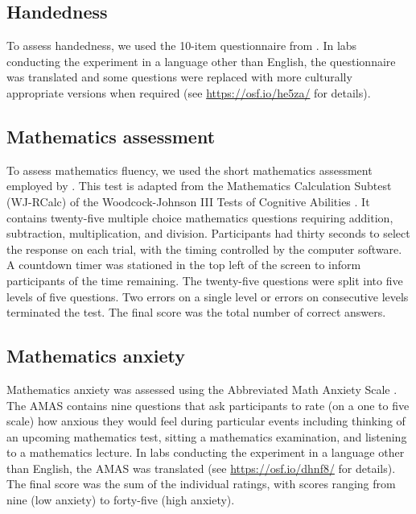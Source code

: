 \documentclass[A4paper,man,floatsintext]{apa6}
\theoremstyle{definition}
\theoremstyle{definition}
\theoremstyle{definition}
\theoremstyle{remark}
\begin{document}
\subsection{Handedness}\label{handedness}

To assess handedness, we used the 10-item questionnaire from
\textcite{Nicholls:2013ha}. In labs conducting the experiment in a
language other than English, the questionnaire was translated and some
questions were replaced with more culturally appropriate versions when
required (see \url{https://osf.io/he5za/} for details).

\subsection{Mathematics assessment}\label{mathematics-assessment}

To assess mathematics fluency, we used the short mathematics assessment
employed by \textcite{Tibber:2013ho}. This test is adapted from the
Mathematics Calculation Subtest (WJ-RCalc) of the Woodcock-Johnson III
Tests of Cognitive Abilities \autocite{Woodcock:1989ww}. It contains
twenty-five multiple choice mathematics questions requiring addition,
subtraction, multiplication, and division. Participants had thirty
seconds to select the response on each trial, with the timing controlled
by the computer software. A countdown timer was stationed in the top
left of the screen to inform participants of the time remaining. The
twenty-five questions were split into five levels of five questions. Two
errors on a single level or errors on consecutive levels terminated the
test. The final score was the total number of correct answers.

\subsection{Mathematics anxiety}\label{mathematics-anxiety}

Mathematics anxiety was assessed using the Abbreviated Math Anxiety
Scale \autocite[AMAS;][]{Hopko:2003et}. The AMAS contains nine questions
that ask participants to rate (on a one to five scale) how anxious they
would feel during particular events including thinking of an upcoming
mathematics test, sitting a mathematics examination, and listening to a
mathematics lecture. In labs conducting the experiment in a language
other than English, the AMAS was translated (see
\url{https://osf.io/dhnf8/} for details). The final score was the sum of
the individual ratings, with scores ranging from nine (low anxiety) to
forty-five (high anxiety).
\end{document}
